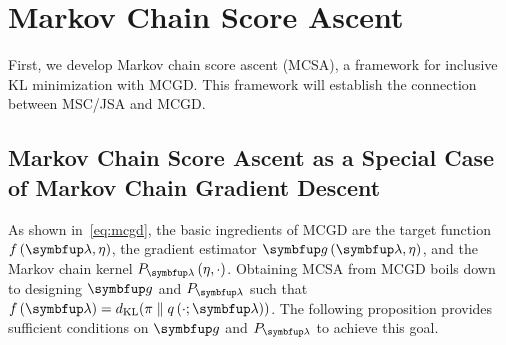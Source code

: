 
\vspace{-1.5ex}
\section{Markov Chain Score Ascent}\label{section:mcsa}
\vspace{-1.0ex}

First, we develop Markov chain score ascent (MCSA), a framework for inclusive KL minimization with MCGD.
This framework will establish the connection between MSC/JSA and MCGD.

\vspace{-1.ex}
\subsection{Markov Chain Score Ascent as a Special Case of Markov Chain Gradient Descent}\label{section:convergence}
\vspace{-1.ex}
As shown in~\cref{eq:mcgd}, the basic ingredients of MCGD are the target function \(f\left(\vlambda, \eta\right)\), the gradient estimator \(\vg\left(\vlambda, \eta\right)\), and the Markov chain kernel \(P_{\vlambda}\left(\eta, \cdot\right)\).
Obtaining MCSA from MCGD boils down to designing \(\vg\) and \(P_{\vlambda}\) such that \(f\left(\vlambda\right) = \DKL{\pi}{q\left(\cdot; \vlambda\right)} \).
The following proposition provides sufficient conditions on \(\vg\) and \(P_{\vlambda}\) to achieve this goal.

\vspace{0.07in}


